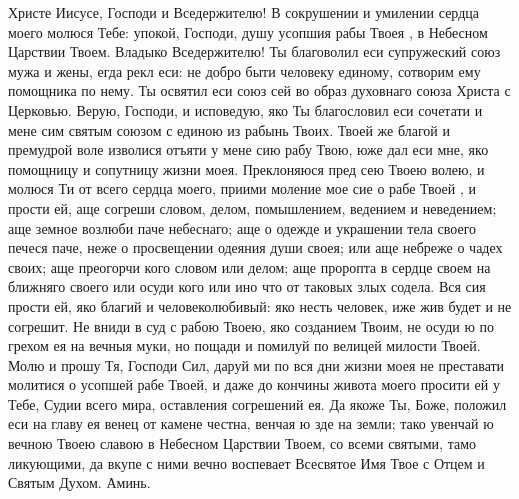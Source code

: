 \begin{mymulticols}


Христе Иисусе, Господи и Вседержителю! В сокрушении и умилении сердца моего молюся Тебе: упокой, Господи, душу усопшия рабы Твоея , в Небесном Царствии Твоем. Владыко Вседержителю! Ты благоволил еси супружеский союз мужа и жены, егда рекл еси: не добро быти человеку единому, сотворим ему помощника по нему. Ты освятил еси союз сей во образ духовнаго союза Христа с Церковью. Верую, Господи, и исповедую, яко Ты благословил еси сочетати и мене сим святым союзом с единою из рабынь Твоих. Твоей же благой и премудрой воле изволися отъяти у мене сию рабу Твою, юже дал еси мне, яко помощницу и сопутницу жизни моея. Преклоняюся пред сею Твоею волею, и молюся Ти от всего сердца моего, приими моление мое сие о рабе Твоей , и прости ей, аще согреши словом, делом, помышлением, ведением и неведением; аще земное возлюби паче небеснаго; аще о одежде и украшении тела своего печеся паче, неже о просвещении одеяния души своея; или аще небреже о чадех своих; аще преогорчи кого словом или делом; аще проропта в сердце своем на ближняго своего или осуди кого или ино что от таковых злых содела. Вся сия прости ей, яко благий и человеколюбивый: яко несть человек, иже жив будет и не согрешит. Не вниди в суд с рабою Твоею, яко созданием Твоим, не осуди ю по грехом ея на вечныя муки, но пощади и помилуй по велицей милости Твоей. Молю и прошу Тя, Господи Сил, даруй ми по вся дни жизни моея не преставати молитися о усопшей рабе Твоей, и даже до кончины живота моего просити ей у Тебе, Судии всего мира, оставления согрешений ея. Да якоже Ты, Боже, положил еси на главу ея венец от камене честна, венчая ю зде на земли; тако увенчай ю вечною Твоею славою в Небесном Царствии Твоем, со всеми святыми, тамо ликующими, да вкупе с ними вечно воспевает Всесвятое Имя Твое с Отцем и Святым Духом. Аминь. 

\end{mymulticols}

\mychapterending

